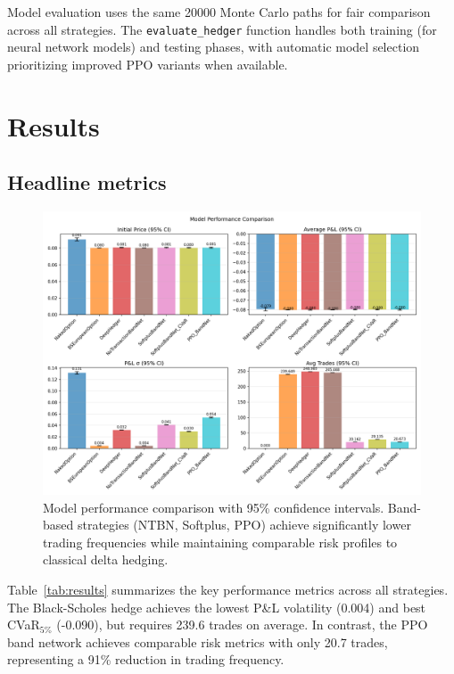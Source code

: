 \documentclass[11pt,letterpaper]{article}
\begin{document}
Model evaluation uses the same \num{20000} Monte Carlo paths for fair comparison across all strategies. The \texttt{evaluate\_hedger} function handles both training (for neural network models) and testing phases, with automatic model selection prioritizing improved PPO variants when available.

\section{Results}\label{sec:results}
\subsection{Headline metrics}
\begin{figure}[h]
  \centering
  \includegraphics[width=\linewidth]{figures/metrics_comparison.png}
  \caption{Model performance comparison with 95\% confidence intervals. Band-based strategies (NTBN, Softplus, PPO) achieve significantly lower trading frequencies while maintaining comparable risk profiles to classical delta hedging.}
  \label{fig:metrics}
\end{figure}

Table~\ref{tab:results} summarizes the key performance metrics across all strategies. The Black-Scholes hedge achieves the lowest P\&L volatility (\num{0.004}) and best CVaR$_{5\%}$ (-0.090), but requires \num{239.6} trades on average. In contrast, the PPO band network achieves comparable risk metrics with only \num{20.7} trades, representing a 91\% reduction in trading frequency.
\end{document}
